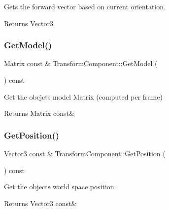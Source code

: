 Gets the forward vector based on current orientation. 

\begin{DoxyReturn}{Returns}
Vector3 
\end{DoxyReturn}
\mbox{\label{classTransformComponent_a558145da72066c99bec2a4a8ec3e2fa1}} 
\subsubsection{\texorpdfstring{Get\+Model()}{GetModel()}}
{\footnotesize\ttfamily Matrix const  \& Transform\+Component\+::\+Get\+Model (\begin{DoxyParamCaption}{ }\end{DoxyParamCaption}) const}



Get the obejct\textquotesingle{}s model Matrix (computed per frame) 

\begin{DoxyReturn}{Returns}
Matrix const\& 
\end{DoxyReturn}
\mbox{\label{classTransformComponent_a31ce3a262b59b97eadd0187319ed812d}} 
\subsubsection{\texorpdfstring{Get\+Position()}{GetPosition()}}
{\footnotesize\ttfamily Vector3 const  \& Transform\+Component\+::\+Get\+Position (\begin{DoxyParamCaption}{ }\end{DoxyParamCaption}) const}



Get the object\textquotesingle{}s world space position. 

\begin{DoxyReturn}{Returns}
Vector3 const\& 
\end{DoxyReturn}
\mbox{\label{classTransformComponent_a5fe2a35d3bcb6a07a231b0f463d6a64b}} 
